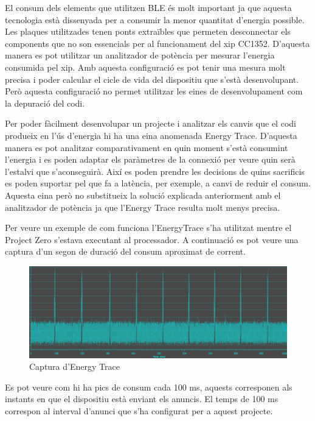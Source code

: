 El consum dels elements que utilitzen BLE és molt important ja que aquesta tecnologia està dissenyada per a consumir la menor quantitat d'energia possible.
Les plaques utilitzades tenen ponts extraïbles que permeten desconnectar els components que no son essencials per al funcionament del xip CC1352.
D'aquesta manera es pot utilitzar un analitzador de potència per mesurar l'energia consumida pel xip.
Amb aquesta configuració es pot tenir una mesura molt precisa i poder calcular el cicle de vida del dispositiu que s'està desenvolupant.
Però aquesta configuració no permet utilitzar les eines de desenvolupament com la depuració del codi.

Per poder fàcilment desenvolupar un projecte i analitzar els canvis que el codi produeix en l'ús d'energia hi ha una eina anomenada Energy Trace.
D'aquesta manera es pot analitzar comparativament en quin moment s'està consumint l'energia i es poden adaptar els paràmetres de la connexió per veure quin serà l'estalvi que s'aconseguirà.
Així es poden prendre les decisions de quins sacrificis es poden suportar pel que fa a latència, per exemple, a canvi de reduir el consum.
Aquesta eina però no substitueix la solució explicada anteriorment amb el analitzador de potència ja que l'Energy Trace resulta molt menys precisa.

Per veure un exemple de com funciona l'EnergyTrace s'ha utilitzat mentre el Project Zero s'estava executant al processador. A continuació es pot veure una captura d'un segon de duració del consum aproximat de corrent.
\begin{figure}[!h]
	\begin{center}
		\includegraphics[width=\textwidth]{./images/energy_trace.png}
		\caption{Captura d'Energy Trace}
	\end{center}
\end{figure}

Es pot veure com hi ha pics de consum cada 100 ms, aquests corresponen als instants en que el dispositiu està enviant els anuncis.
El temps de 100 ms correspon al interval d'anunci que s'ha configurat per a aquest projecte.

